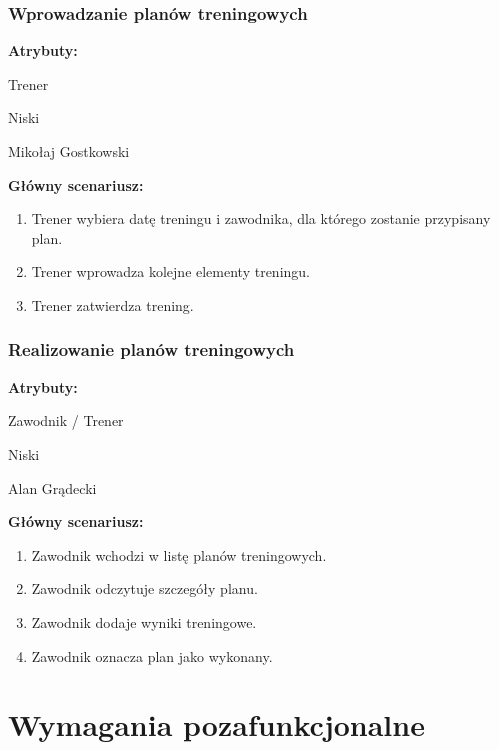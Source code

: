 \documentclass[polish, a4paper]{article}
\begin{document}
\subsubsection{Wprowadzanie planów treningowych}
\noindent
\textbf{Atrybuty:}
\begin{description}[labelindent=0.5cm]
    \item[Główny aktor:]{Trener}
    \item[Priorytet:]{Niski}
    \item[Źródło:]{Mikołaj Gostkowski}
\end{description}

\noindent
\textbf{Główny scenariusz:}
\begin{enumerate}
    \item Trener wybiera datę treningu i zawodnika, dla którego zostanie przypisany plan.
    \item Trener wprowadza kolejne elementy treningu.
    \item Trener zatwierdza trening.
\end{enumerate}

\subsubsection{Realizowanie planów treningowych}
\noindent
\textbf{Atrybuty:}
\begin{description}[labelindent=0.5cm]
    \item[Główny aktor:]{Zawodnik / Trener}
    \item[Priorytet:]{Niski}
    \item[Źródło:]{Alan Grądecki}
\end{description}

\noindent
\textbf{Główny scenariusz:}
\begin{enumerate}
    \item Zawodnik wchodzi w listę planów treningowych.
    \item Zawodnik odczytuje szczegóły planu.
    \item Zawodnik dodaje wyniki treningowe.
    \item Zawodnik oznacza plan jako wykonany.
\end{enumerate}


\section{Wymagania pozafunkcjonalne}
\end{document}
